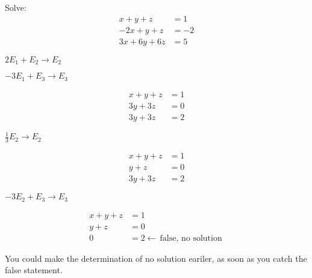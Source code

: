 \begin{example}[2]

	Solve:
	\begin{align*}
		x + y + z &= 1 \\
		-2x + y + z &= -2 \\
		3x + 6y + 6z &= 5
	\end{align*}

	$2E_1 + E_2 \to E_2$

	$-3E_1 + E_3 \to E_3$


	\begin{align*}
		x + y + z &= 1 \\
		 3y + 3z &= 0 \\
		3y + 3z &= 2
	\end{align*}

	$\frac{1}{3}E_2 \to E_2$

	\begin{align*}
		x + y + z &= 1 \\
		 y + z &= 0 \\
		3y + 3z &= 2
	\end{align*}

	$-3E_2+E_3 \to E_3$

	\begin{align*}
		x + y + z &= 1 \\
		 y + z &= 0 \\
		 0 &= 2  \leftarrow \:\text{false, no solution}\:
	\end{align*}

	You could make the determination of no solution eariler, as soon as you catch the false statement.
\end{example}

